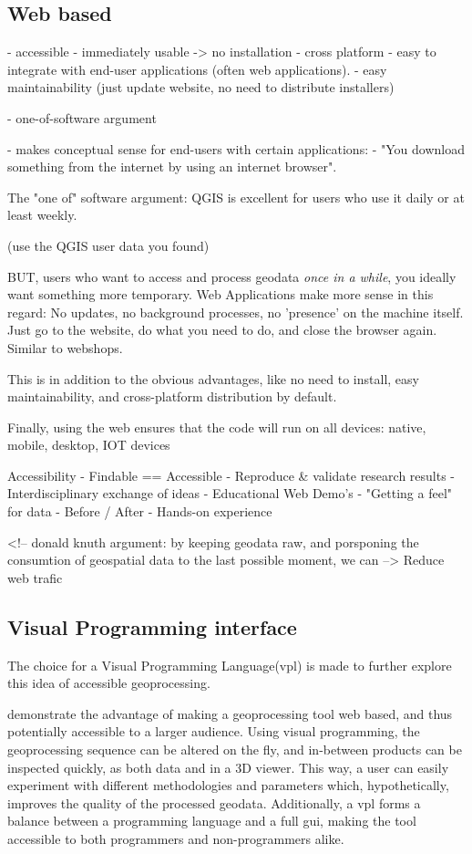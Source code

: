 \subsection{ Web based }

- accessible
    - immediately usable -> no installation
    - cross platform
    - easy to integrate with end-user applications (often web applications).
    - easy maintainability (just update website, no need to distribute installers)

- one-of-software argument

- makes conceptual sense for end-users with certain applications: 
  - "You download something from the internet by using an internet browser".

The "one of" software argument: QGIS is excellent for users who use it daily or at least weekly. 

(use the QGIS user data you found)

BUT, users who want to access and process geodata \emph{once in a while}, you ideally want something more temporary. Web Applications make more sense in this regard: No updates, no background processes, no 'presence' on the machine itself. Just go to the website, do what you need to do, and close the browser again. Similar to webshops.

This is in addition to the obvious advantages, like no need to install, easy maintainability, and cross-platform distribution by default.

Finally, using the web ensures that the code will run on all devices: native, mobile, desktop, IOT devices


Accessibility
- Findable == Accessible
- Reproduce \& validate research results 
- Interdisciplinary exchange of ideas 
- Educational Web Demo's
- "Getting a feel" for data 
   - Before / After
   - Hands-on experience

<!-- donald knuth argument: by keeping geodata raw, and porsponing the consumtion of geospatial data to the last possible moment, we can  -->
Reduce web trafic

\subsection{Visual Programming interface}

The choice for a Visual Programming Language(vpl) is made to further explore this idea of accessible geoprocessing. 

demonstrate the advantage of making a geoprocessing tool web based, and thus potentially accessible to a larger audience. 
Using visual programming, the geoprocessing sequence can be altered on the fly, and in-between products can be inspected quickly, as both data and in a 3D viewer. 
This way, a user can easily experiment with different methodologies and parameters which, hypothetically, improves the quality of the processed geodata.
Additionally, a vpl forms a balance between a programming language and a full gui, making the tool accessible to both programmers and non-programmers alike.

